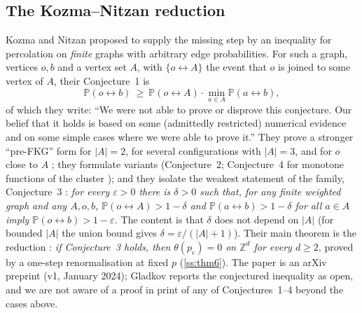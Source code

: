 \documentclass[11pt]{article}
\theoremstyle{definition}
\theoremstyle{remark}
\newcommand{\PP}{\mathbb{P}}
\newcommand{\Zd}{\mathbb{Z}^d}
\newcommand{\pc}{p_{\mathrm c}}
\newcommand{\con}{\leftrightarrow}
\begin{document}
\subsection{The Kozma--Nitzan reduction}\label{ss:KN}
Kozma and Nitzan \citep{KozmaNitzan2024} proposed to supply the missing step by an inequality for percolation on \emph{finite} graphs
with arbitrary edge probabilities.  For such a graph, vertices $o,b$ and a vertex set $A$, with $\{o\con A\}$ the event that $o$ is
joined to some vertex of $A$, their Conjecture~1 \citep[p.~3]{KozmaNitzan2024} is
\begin{equation}\label{eq:KN1}
 \PP(o\con b)\ \ge\ \PP(o\con A)\cdot\min_{a\in A}\PP(a\con b),
\end{equation}
of which they write: ``We were not able to prove or disprove this conjecture.  Our belief that it holds is based on some (admittedly
restricted) numerical evidence and on some simple cases where we were able to prove it.''  They prove a stronger ``pre-FKG'' form for $|A|=2$, for
several configurations with $|A|=3$, and for $o$ close to $A$ \citep[Theorems~1--5]{KozmaNitzan2024}; they formulate variants (Conjecture~2;
Conjecture~4 for monotone functions of the cluster \citep[p.~32]{KozmaNitzan2024}); and they isolate the weakest statement of the family,
Conjecture~3 \citep[p.~15]{KozmaNitzan2024}:
\emph{for every $\varepsilon>0$ there is $\delta>0$ such that, for any finite weighted graph and any $A,o,b$, $\PP(o\con A)>1-\delta$ and
$\PP(a\con b)>1-\delta$ for all $a\in A$ imply $\PP(o\con b)>1-\varepsilon$.}  The content is that $\delta$ does not depend on $|A|$ (for bounded
$|A|$ the union bound gives $\delta=\varepsilon/(|A|+1)$).  Their main theorem is the reduction
\citep[Theorem~6]{KozmaNitzan2024}: \emph{if Conjecture~3 holds, then $\theta(\pc)=0$ on $\Zd$ for every $d\ge2$}, proved by a
one-step renormalisation at fixed $p$ (\cref{ss:thm6}).  The paper is an arXiv preprint (v1, January 2024); Gladkov
\citep[\S1]{Gladkov2024} reports the conjectured inequality as open, and we are not aware of a proof in print of any of Conjectures~1--4
beyond the cases above.
\end{document}
